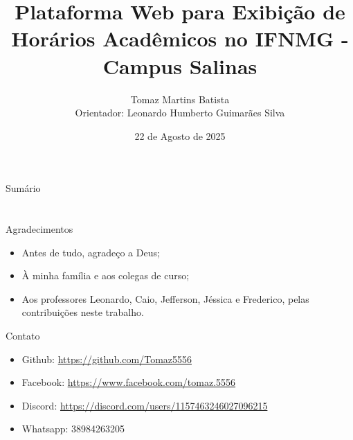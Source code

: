 \documentclass[handout,t]{beamer}
\title[Trabalho de Conclusão de Curso]{
	Plataforma Web para Exibição de Horários Acadêmicos no IFNMG - Campus Salinas}
\date{
	22 de Agosto de 2025}
\author[Autor: Tomaz Martins Batista]{
	Tomaz Martins Batista\\
	Orientador: Leonardo Humberto Guimarães Silva\\
	\vspace{0.5cm}}
\institute[]{
	Bacharelado em Sistemas de informação\\
	Instituto Federal do Norte de Minas Gerais - Campus Salinas\\
	\vspace{0.5cm}}
\begin{document}
\frame{\titlepage}
\section[]{}
\begin{frame}{Sumário}
	\tableofcontents
\end{frame}













%

\section{}
\begin{frame}{Agradecimentos}
	\begin{itemize}
		\item Antes de tudo, agradeço a Deus; \vspace{0.5cm}
		\item À minha família e aos colegas de curso; \vspace{0.5cm}
		\item Aos professores Leonardo, Caio, Jefferson, Jéssica e Frederico, pelas contribuições neste trabalho. \vspace{0.5cm}
	\end{itemize}
\end{frame}

\begin{frame}{Contato}
	\begin{itemize}
		\item Github: \url{https://github.com/Tomaz5556} \vspace{0.5cm}
		\item Facebook: \url{https://www.facebook.com/tomaz.5556} \vspace{0.5cm}
		\item Discord: \url{https://discord.com/users/1157463246027096215} \vspace{0.5cm}
		\item Whatsapp: 38984263205 \vspace{0.5cm}
	\end{itemize}
\end{frame}
\end{document}
